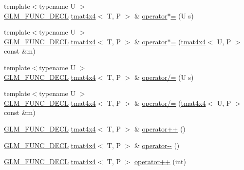 \begin{DoxyCompactItemize}
\item 
{\footnotesize template$<$typename U $>$ }\\\hyperlink{setup_8hpp_ab2d052de21a70539923e9bcbf6e83a51}{G\+L\+M\+\_\+\+F\+U\+N\+C\+\_\+\+D\+E\+CL} \hyperlink{structglm_1_1detail_1_1tmat4x4}{tmat4x4}$<$ T, P $>$ \& \hyperlink{structglm_1_1detail_1_1tmat4x4_a5f45264cb14dad1d45f52b8dc4c21182}{operator$\ast$=} (U s)
\item 
{\footnotesize template$<$typename U $>$ }\\\hyperlink{setup_8hpp_ab2d052de21a70539923e9bcbf6e83a51}{G\+L\+M\+\_\+\+F\+U\+N\+C\+\_\+\+D\+E\+CL} \hyperlink{structglm_1_1detail_1_1tmat4x4}{tmat4x4}$<$ T, P $>$ \& \hyperlink{structglm_1_1detail_1_1tmat4x4_a7f776dccae9e5f84df52c4118986f3f9}{operator$\ast$=} (\hyperlink{structglm_1_1detail_1_1tmat4x4}{tmat4x4}$<$ U, P $>$ const \&m)
\item 
{\footnotesize template$<$typename U $>$ }\\\hyperlink{setup_8hpp_ab2d052de21a70539923e9bcbf6e83a51}{G\+L\+M\+\_\+\+F\+U\+N\+C\+\_\+\+D\+E\+CL} \hyperlink{structglm_1_1detail_1_1tmat4x4}{tmat4x4}$<$ T, P $>$ \& \hyperlink{structglm_1_1detail_1_1tmat4x4_a416de4c3606f70b3472286159d73454a}{operator/=} (U s)
\item 
{\footnotesize template$<$typename U $>$ }\\\hyperlink{setup_8hpp_ab2d052de21a70539923e9bcbf6e83a51}{G\+L\+M\+\_\+\+F\+U\+N\+C\+\_\+\+D\+E\+CL} \hyperlink{structglm_1_1detail_1_1tmat4x4}{tmat4x4}$<$ T, P $>$ \& \hyperlink{structglm_1_1detail_1_1tmat4x4_a642293b379d24a91960b55e9eb2da91b}{operator/=} (\hyperlink{structglm_1_1detail_1_1tmat4x4}{tmat4x4}$<$ U, P $>$ const \&m)
\item 
\hyperlink{setup_8hpp_ab2d052de21a70539923e9bcbf6e83a51}{G\+L\+M\+\_\+\+F\+U\+N\+C\+\_\+\+D\+E\+CL} \hyperlink{structglm_1_1detail_1_1tmat4x4}{tmat4x4}$<$ T, P $>$ \& \hyperlink{structglm_1_1detail_1_1tmat4x4_a4d6675dbac8dc446236babedc6c2642c}{operator++} ()
\item 
\hyperlink{setup_8hpp_ab2d052de21a70539923e9bcbf6e83a51}{G\+L\+M\+\_\+\+F\+U\+N\+C\+\_\+\+D\+E\+CL} \hyperlink{structglm_1_1detail_1_1tmat4x4}{tmat4x4}$<$ T, P $>$ \& \hyperlink{structglm_1_1detail_1_1tmat4x4_a6a724eae9119c2724ccfdb3f418ab31b}{operator-\/-\/} ()
\item 
\hyperlink{setup_8hpp_ab2d052de21a70539923e9bcbf6e83a51}{G\+L\+M\+\_\+\+F\+U\+N\+C\+\_\+\+D\+E\+CL} \hyperlink{structglm_1_1detail_1_1tmat4x4}{tmat4x4}$<$ T, P $>$ \hyperlink{structglm_1_1detail_1_1tmat4x4_afa478e500f09b50da702a53b3f788c0d}{operator++} (int)

\end{DoxyCompactItemize}
